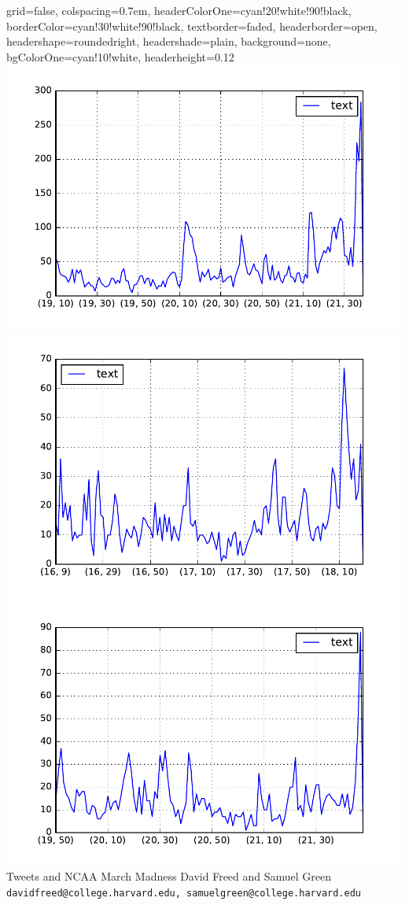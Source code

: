 \documentclass[landscape,a0paper,fontscale=0.292]{baposter}
\begin{document}
\begin{poster}{
 grid=false,
 colspacing=0.7em,
 headerColorOne=cyan!20!white!90!black,
 borderColor=cyan!30!white!90!black,
 textborder=faded,
 headerborder=open,
 headershape=roundedright,
 headershade=plain,
 background=none,
 bgColorOne=cyan!10!white,
 headerheight=0.12\textheight}
 {
      \includegraphics[width=0.12\linewidth]{WvuSFA_clean_timeseries.pdf}
      \includegraphics[width=0.12\linewidth]{OklaCSU_clean_timeseries.pdf}
      \includegraphics[width=0.12\linewidth]{OregonHC_clean_timeseries.pdf}
 }
 {\sc\Huge Tweets and NCAA March Madness}
 {David Freed and Samuel Green\\[1em]
 {\texttt{davidfreed@college.harvard.edu, samuelgreen@college.harvard.edu}}}
 {
  \begin{tabular}{r}

\end{tabular}}
\end{poster}
\end{document}
